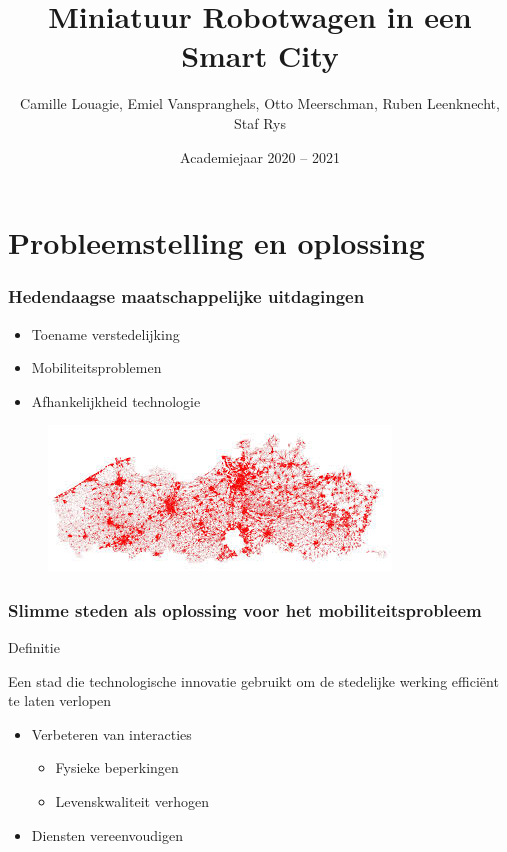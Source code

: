 \documentclass[aspectratio=169,kulak,t,handout]{kulakbeamer} %
\title[Beamer]{Miniatuur Robotwagen in een Smart City}
\author{Camille Louagie, Emiel Vanspranghels, Otto Meerschman, Ruben Leenknecht, Staf Rys}
\institute[Kulak]{KU Leuven Kulak}
\date{Academiejaar 2020 -- 2021}
\begin{document}
\begin{titleframe}
\titlepage
\end{titleframe}


\section{Probleemstelling en oplossing}

\begin{frame}
	\frametitle{Hedendaagse maatschappelijke uitdagingen}

		\begin{itemize}
			\large\item Toename verstedelijking
			\item Mobiliteitsproblemen
			\item Afhankelijkheid technologie
		\end{itemize}


	
	\begin{figure}
		\centering
		\includegraphics[width=.6\textwidth]{ruimtelijkestaat}
		
		\label{fig:CAD-model}
	\end{figure}
	
\end{frame}

\begin{frame}
	\frametitle{Slimme steden als oplossing voor het mobiliteitsprobleem}
	
\begin{block}{Definitie}
	
	Een stad die technologische innovatie gebruikt om de stedelijke werking efficiënt te laten verlopen
	
\end{block}	
	\begin{itemize}
		\large\item  Verbeteren van interacties
		\begin{itemize}
			\normalsize\item Fysieke beperkingen
			\item Levenskwaliteit verhogen
		\end{itemize}
		\item  Diensten vereenvoudigen
	\end{itemize}
\end{frame}
\end{document}
